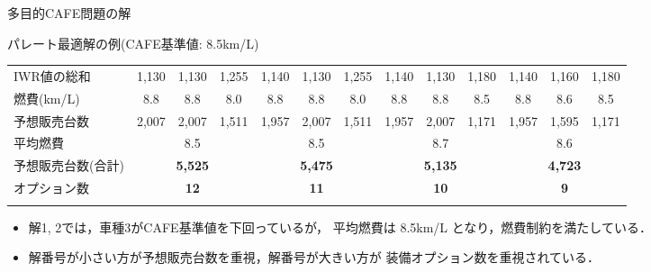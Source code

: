 \documentclass[dvipdfmx, 11pt]{beamer}
\begin{document}
\begin{frame}{多目的CAFE問題の解}
\begin{exampleblock}{パレート最適解の例{\normalsize (CAFE基準値: 8.5km/L)}}
\begin{tabular}{l|l|c|c|c||c|c|c||c|c|c||c|c|c}
   \multicolumn{2}{l|}{IWR値の総和} & 1,130 & 1,130 & 1,255 & 1,140 & 1,130 & 1,255 & 1,140 & 1,130 & 1,180 & 1,140 & 1,160 & 1,180  \\
   \multicolumn{2}{l|}{燃費(km/L)} & 8.8 & 8.8 & 8.0 & 8.8 & 8.8 & 8.0 & 8.8 & 8.8 & 8.5 & 8.8 & 8.6 & 8.5 \\
   \multicolumn{2}{l|}{予想販売台数} & 2,007 & 2,007 & 1,511 & 1,957 & 2,007 & 1,511 & 1,957 & 2,007  & 1,171 & 1,957 & 1,595 & 1,171 \\ \hline
   \multicolumn{2}{l|}{平均燃費}  & \multicolumn{3}{c||}{8.5} & \multicolumn{3}{c||}{8.5} & \multicolumn{3}{c||}{8.7} & \multicolumn{3}{c}{8.6} \\ 
   \multicolumn{2}{l|}{予想販売台数(合計)}  & \multicolumn{3}{c||}{\bf 5,525} & \multicolumn{3}{c||}{\bf 5,475} & \multicolumn{3}{c||}{\bf 5,135} & \multicolumn{3}{c}{\bf 4,723} \\ 
   \multicolumn{2}{l|}{オプション数} & \multicolumn{3}{c||}{\bf 12} & \multicolumn{3}{c||}{\bf 11} & \multicolumn{3}{c||}{\bf 10} & \multicolumn{3}{c}{\bf 9} \\
   \multicolumn{14}{c}{}
  \end{tabular}

 \end{exampleblock}

 
 \begin{itemize}
  \item 解1, 2では，車種3がCAFE基準値を下回っているが，
	平均燃費は 8.5km/L となり，燃費制約を満たしている．
  \item 解番号が小さい方が予想販売台数を重視，解番号が大きい方が
	装備オプション数を重視されている．
 \end{itemize}
\end{frame}
\end{document}
